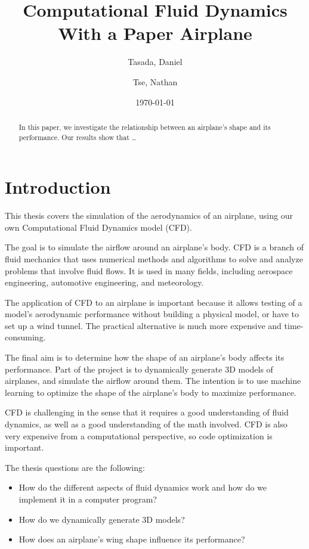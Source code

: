 \documentclass[a4paper,12pt]{article}
\title{Computational Fluid Dynamics With a Paper Airplane}
\author{
  Tasada, Daniel\\
  \and
  Tse, Nathan\\
}
\date{\today}
\begin{document}
\maketitle
\begin{abstract}
	In this paper, we investigate the relationship between an airplane's shape
	and its performance. Our results show that \dots
\end{abstract}

\tableofcontents

\section{Introduction}
This thesis covers the simulation of the aerodynamics of an airplane, using
our own Computational Fluid Dynamics model (CFD).

The goal is to simulate the airflow around an airplane's body. CFD is a
branch of fluid mechanics that uses numerical methods and algorithms to solve
and analyze problems that involve fluid flows. It is used in many fields,
including aerospace engineering, automotive engineering, and meteorology.

The application of CFD to an airplane is important because it allows testing
of a model's aerodynamic performance without building a physical model, or
have to set up a wind tunnel. The practical alternative is much more expensive
and time-consuming.

The final aim is to determine how the shape of an airplane's body affects its
performance. Part of the project is to dynamically generate 3D models of
airplanes, and simulate the airflow around them. The intention is to use
machine learning to optimize the shape of the airplane's body to maximize
performance.

CFD is challenging in the sense that it requires a good understanding of fluid
dynamics, as well as a good understanding of the math involved. CFD is also
very expensive from a computational perspective, so code optimization is important.

The thesis questions are the following:
\begin{itemize}
	\item{How do the different aspects of fluid dynamics work and how do we
		implement it in a computer program?}
	\item{How do we dynamically generate 3D models?}
	\item{How does an airplane's wing shape influence its performance?}
\end{itemize}
\end{document}

